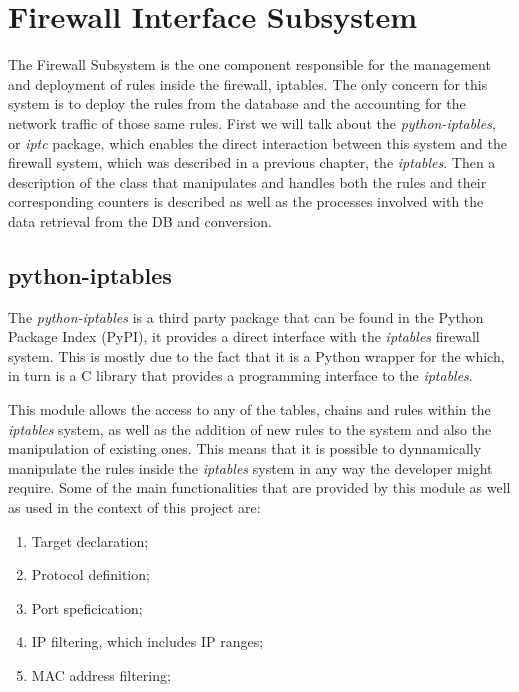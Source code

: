 \section{Firewall Interface Subsystem}
\label{chap4:sec:firewall-sys}
The Firewall Subsystem is the one component responsible for the management and
deployment of rules inside the firewall, iptables. The only concern for this
system is to deploy the rules from the database and the accounting for the
network traffic of those same rules. First we will talk about the
\emph{python-iptables}, or \emph{iptc} package, which enables the direct
interaction between this system and the firewall system, which was described in
a previous chapter, the \emph{iptables}. Then a description of the class that
manipulates and handles both the rules and their corresponding counters is
described as well as the processes involved with the data retrieval from the DB
and conversion.

\subsection{python-iptables}
\label{chap4:sec:firewall-sys:iptc}
The \emph{python-iptables} is a third party package that can be found in the
Python Package Index (PyPI), it provides a direct interface with the
\emph{iptables} firewall system. This is mostly due to the fact that it is a
Python wrapper for the  which, in turn is a C library that
provides a programming interface to the \emph{iptables}.

This module allows the access to any of the tables, chains and rules within the
\emph{iptables} system, as well as the addition of new rules to the system and
also the manipulation of existing ones. This means that it is possible to
dynnamically manipulate the rules inside the \emph{iptables} system in any way
the developer might require.
Some of the main functionalities that are provided by this module as well as
used in the context of this project are:
\begin{enumerate}
	\item Target declaration;
	\item Protocol definition;
	\item Port speficication;
	\item IP filtering, which includes IP ranges;
	\item MAC address filtering;
\end{enumerate}


